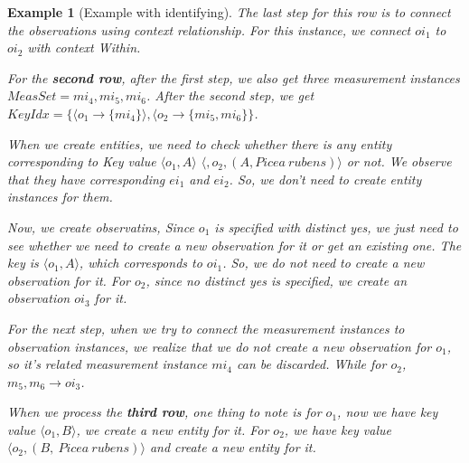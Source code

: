 \documentclass[10pt]{article}
\newtheorem{example}{Example}[section]
\begin{document}
\begin{example} [Example with identifying]
The last step for this row is to connect the observations using context relationship. For this instance, we connect $oi_1$ to $oi_2$ with context {\em Within}. 

For the {\bf second row}, after the first step, we also get three measurement instances $MeasSet=mi_4, mi_5, mi_6$. 
After the second step, we get $KeyIdx = \{\langle o_1\rightarrow \{mi_4\} \rangle, \langle o_2 \rightarrow \{mi_5, mi_6\}\}$.

When we create entities, 
we need to check whether there is any entity corresponding to Key value $\langle o_1, A\rangle$ $\langle, o_2, (A, Picea~rubens)\rangle$ or not.
We observe that they have corresponding $ei_1$ and $ei_2$. So, we don't need to create entity instances for them. 

Now, we create observatins, 
Since $o_1$ is specified with {\em distinct yes}, we just need to see whether we need to create a new observation for it or get an existing one. 
The key is $\langle o_1,A\rangle$, which corresponds to $oi_1$. So, we do not need to create a new observation for it. 
For $o_2$, since no {\em distinct yes} is specified, we create an observation $oi_3$ for it. 

For the next step, when we try to connect the measurement instances to observation instances, we realize that we do not create a new observation for $o_1$,
so it's related measurement instance $mi_4$ can be discarded. While for $o_2$, $m_5, m_6\rightarrow oi_3$. 

When we process the {\bf third row}, one thing to note is for $o_1$, now we have key value $\langle o_1, B\rangle$, we create a new entity for it.
For $o_2$, we have key value $\langle o_2, (B,~Picea~rubens)\rangle$ and create a new entity for it. 


\end{example}
\end{document}

